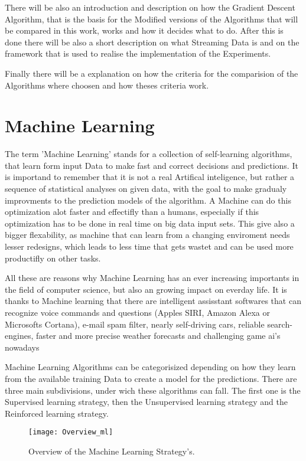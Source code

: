 \documentclass[12pt,oneside,a4paper,parskip]{scrbook}
\begin{document}
There will be also an introduction and description on how the Gradient Descent Algorithm, that is the basis for the 
Modified versions of the Algorithms that will be compared in this work, works and how it decides what to do. 
After this is done there will be also a short description on what Streaming Data is and on the framework that is used to 
realise the implementation of the Experiments.

Finally there will be a explanation on how the criteria for the comparision of the Algorithms where choosen and how 
theses criteria work.

\section{Machine Learning}

The term 'Machine Learning' stands for a collection of self-learning algorithms, that learn form input Data to make 
fast and correct decisions and predictions. It is importand to remember that it is not a real Artifical inteligence, 
but rather a sequence of statistical analyses on given data, with the goal to make gradualy improvments to the prediction 
models of the algorithm.  
A Machine can do this optimization alot faster and effectifly than a humans, especially if this optimization has to be 
done in real time on big data input sets. This give also a bigger flexability, as machine that can learn from a changing 
enviroment needs lesser redesigns, which leads to less time that gets wastet and can be used more productifly on other 
tasks. 

All these are reasons why Machine Learning has an ever increasing importants in the field of computer science, 
but also an growing impact on everday life. It is thanks to Machine learning that there are intelligent assisstant 
softwares that can recognize voice commands and questions (Apples SIRI, Amazon Alexa or Microsofts Cortana),
e-mail spam filter, nearly self-driving cars, reliable search-engines, faster and more precise weather forecasts and 
challenging game ai's nowadays 

Machine Learning Algorithms can be categorisized depending on how they learn from the available training Data to create 
a model for the predictions. There are three main subdivisions, under wich these algorithms can fall. 
The first one is the Supervised learning strategy, then the Unsupervised learning strategy and the Reinforced learning 
strategy. 

\begin{figure}
  \texttt{[image: Overview\_ml]}
  \caption{Overview of the Machine Learning Strategy's.}
  \label{fig:overview_ML}
\end{figure}
\end{document}
